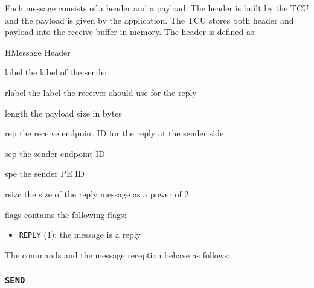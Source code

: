 \documentclass[a4paper,11pt]{article}
\begin{document}
Each message consists of a header and a payload. The header is built by the TCU and the payload is
given by the application. The TCU stores both header and payload into the receive buffer in memory.
The header is defined as:

\begin{register}{H}{Message Header}{}
  \regnewline%
  \regnewline%
  \begin{regdesc}\begin{reglist}
    \item[label] the label of the sender
    \item[rlabel] the label the receiver should use for the reply
    \item[length] the payload size in bytes
    \item[rep] the receive endpoint ID for the reply at the sender side
    \item[sep] the sender endpoint ID
    \item[spe] the sender PE ID
    \item[rsize] the size of the reply message as a power of 2
    \item[flags] contains the following flags:
    \begin{itemize}
      \item \texttt{REPLY} (1): the message is a reply
    \end{itemize}
  \end{reglist}\end{regdesc}
\end{register}

\noindent The commands and the message reception behave as follows:

\subsubsection{\texttt{SEND}}
\end{document}
